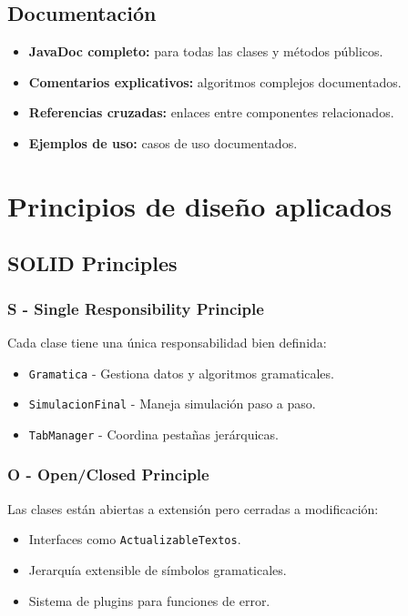\subsection{Documentación}

\begin{itemize}
    \item \textbf{JavaDoc completo:} para todas las clases y métodos públicos.
    \item \textbf{Comentarios explicativos:} algoritmos complejos documentados.
    \item \textbf{Referencias cruzadas:} enlaces entre componentes relacionados.
    \item \textbf{Ejemplos de uso:} casos de uso documentados.
\end{itemize}

\section{Principios de diseño aplicados}

\subsection{SOLID Principles}

\subsubsection{S - Single Responsibility Principle}

Cada clase tiene una única responsabilidad bien definida:
\begin{itemize}
    \item \texttt{Gramatica} - Gestiona datos y algoritmos gramaticales.
    \item \texttt{SimulacionFinal} - Maneja simulación paso a paso.
    \item \texttt{TabManager} - Coordina pestañas jerárquicas.
\end{itemize}

\subsubsection{O - Open/Closed Principle}

Las clases están abiertas a extensión pero cerradas a modificación:
\begin{itemize}
    \item Interfaces como \texttt{ActualizableTextos}.
    \item Jerarquía extensible de símbolos gramaticales.
    \item Sistema de plugins para funciones de error.
\end{itemize}

